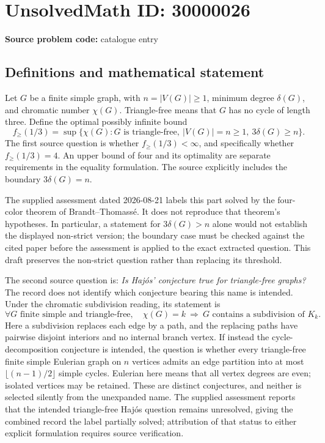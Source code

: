 \documentclass[11pt]{article}
\begin{document}
\section*{UnsolvedMath ID: 30000026}
\textbf{Source problem code:} catalogue entry
\subsection{Definitions and mathematical statement}
Let \(G\) be a finite simple graph, with \(n=|V(G)|\geq1\), minimum degree \(\delta(G)\), and chromatic number \(\chi(G)\). Triangle-free means that \(G\) has no cycle of length three. Define the optimal possibly infinite bound
\[
f_{\geq}(1/3)=\sup\{\chi(G):G\text{ is triangle-free},\ |V(G)|=n\geq1,\ 3\delta(G)\geq n\}.
\]
The first source question is whether \(f_{\geq}(1/3)<\infty\), and specifically whether \(f_{\geq}(1/3)=4\). An upper bound of four and its optimality are separate requirements in the equality formulation. The source explicitly includes the boundary \(3\delta(G)=n\).

The supplied assessment dated 2026-08-21 labels this part solved by the four-color theorem of Brandt--Thomass\'e. It does not reproduce that theorem's hypotheses. In particular, a statement for \(3\delta(G)>n\) alone would not establish the displayed non-strict version; the boundary case must be checked against the cited paper before the assessment is applied to the exact extracted question. This draft preserves the non-strict question rather than replacing its threshold.

The second source question is: \emph{Is Haj\'os' conjecture true for triangle-free graphs?} The record does not identify which conjecture bearing this name is intended. Under the chromatic subdivision reading, its statement is
\[
\forall G\text{ finite simple and triangle-free},\quad
\chi(G)=k\ \Longrightarrow\ G\text{ contains a subdivision of }K_k.
\]
Here a subdivision replaces each edge by a path, and the replacing paths have pairwise disjoint interiors and no internal branch vertex. If instead the cycle-decomposition conjecture is intended, the question is whether every triangle-free finite simple Eulerian graph on \(n\) vertices admits an edge partition into at most \(\lfloor(n-1)/2\rfloor\) simple cycles. Eulerian here means that all vertex degrees are even; isolated vertices may be retained. These are distinct conjectures, and neither is selected silently from the unexpanded name. The supplied assessment reports that the intended triangle-free Haj\'os question remains unresolved, giving the combined record the label partially solved; attribution of that status to either explicit formulation requires source verification.
\end{document}
